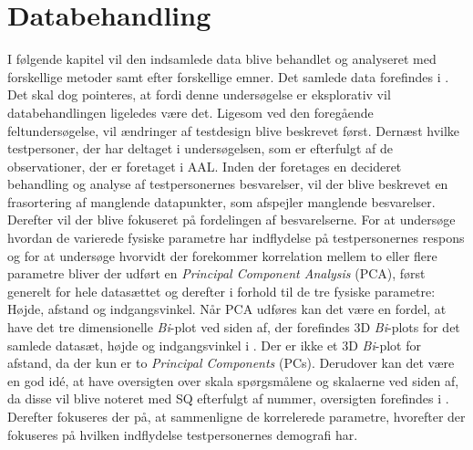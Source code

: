 \chapter{Databehandling}
\label{TestAfSkalaDatabehandling}
%
I følgende kapitel vil den indsamlede data blive behandlet og analyseret med forskellige metoder samt efter forskellige emner. Det samlede data forefindes i . Det skal dog pointeres, at fordi denne undersøgelse er eksplorativ vil databehandlingen ligeledes være det. Ligesom ved den foregående feltundersøgelse, vil ændringer af testdesign blive beskrevet først. Dernæst hvilke testpersoner, der har deltaget i undersøgelsen, som er efterfulgt af de observationer, der er foretaget i AAL. Inden der foretages en decideret behandling og analyse af testpersonernes besvarelser, vil der blive  beskrevet en frasortering af manglende datapunkter, som afspejler manglende besvarelser. Derefter vil der blive fokuseret på fordelingen af besvarelserne. For at undersøge hvordan de varierede fysiske parametre har indflydelse på testpersonernes respons og for at undersøge hvorvidt der forekommer korrelation mellem to eller flere parametre bliver der udført en \textit{Principal Component Analysis} (PCA), først generelt for hele datasættet og derefter i forhold til de tre fysiske parametre: Højde, afstand og indgangsvinkel. Når PCA udføres kan det være en fordel, at have det tre dimensionelle \textit{Bi}-plot ved siden af, der forefindes 3D \textit{Bi}-plots for det samlede datasæt, højde og indgangsvinkel i . Der er ikke et 3D \textit{Bi}-plot for afstand, da der kun er to \textit{Principal Components} (PCs). Derudover kan det være en god idé, at have oversigten over skala spørgsmålene og skalaerne ved siden af, da disse vil blive noteret med SQ efterfulgt af nummer, oversigten forefindes i . Derefter fokuseres der på, at sammenligne de korrelerede parametre, hvorefter der fokuseres på hvilken indflydelse testpersonernes demografi har.        
